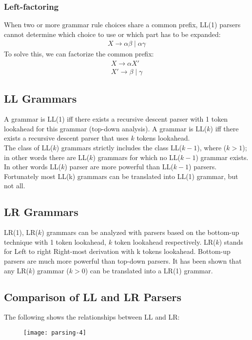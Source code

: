 \subsubsection{Left-factoring}
When two or more grammar rule choices share a common prefix,
LL(1) parsers cannot determine which choice to use or which part
has to be expanded:
\begin{align*}
  X \rightarrow \alpha \beta \mid \alpha \gamma
\end{align*}
To solve this, we can factorize the common prefix:
\begin{align*}
  X \rightarrow \alpha X'\\
  X' \rightarrow \beta \mid \gamma
\end{align*}
\subsection{LL Grammars}
A grammar is LL(1) iff there exists a recursive descent parser with
1 token lookahead for this grammar (top-down analysis).
A grammar is LL($k$) iff there exists a recursive descent parser that
uses $k$ tokens lookahead.\\

The class of LL($k$) grammars strictly includes the class LL($k - 1$),
  where ($k > 1$); in other words there are LL($k$) grammars for which
  no LL($k - 1$) grammar exists. In other words LL($k$) parser are
  more powerful than LL($k - 1$) parsers.\\

  Fortunately most LL(k) grammars can be translated into
  LL(1) grammar, but not all.

\subsection{LR Grammars}
LR(1), LR($k$) grammars can be analyzed with parsers based on the
bottom-up technique with 1 token lookahead, $k$ token lookahead
respectively.
LR($k$) stands for Left to right Right-most derivation with k tokens
lookahead.
Bottom-up parsers are much more powerful than top-down parsers.
It has been shown that any LR($k$) grammar ($k > 0$) can be
translated into a LR(1) grammar.\\

\subsection{Comparison of LL and LR Parsers}
The following shows the relationships between LL and LR:
\begin{figure}[H]
  \centering
  \texttt{[image: parsing-4]}
\end{figure}

